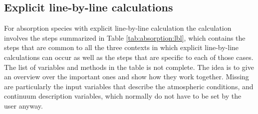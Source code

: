 \subsection{Explicit line-by-line calculations}

For absorption species with explicit line-by-line calculation the
calculation involves the steps summarized in Table
\ref{tab:absorption:lbl}, which contains the steps that are common to all the
three contexts in which explicit line-by-line calculations can occur as well
as the steps that are specific to each of those cases. 
The list of variables and methods in the
table is not complete. The idea is to give an overview over the
important ones and show how they work together. Missing are
particularly the input variables that describe the atmospheric
conditions, and continuum description variables, which normally do not
have to be set by the user anyway.


